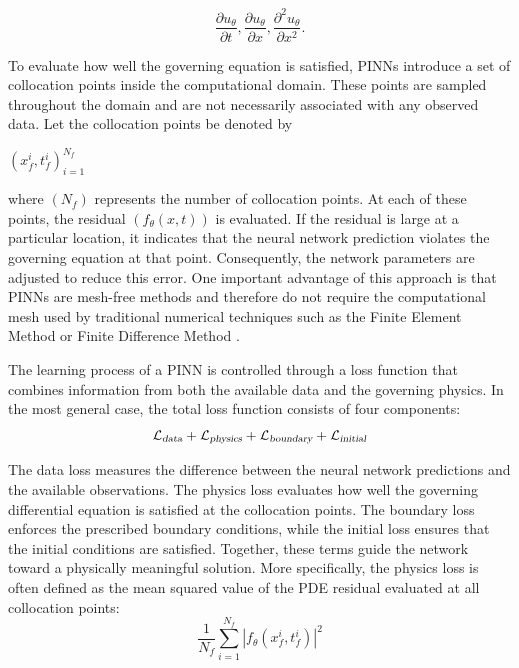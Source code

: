 \documentclass[11pt]{article}
\begin{document}
\begin{equation}
	\frac{\partial u_\theta}{\partial t},
	\frac{\partial u_\theta}{\partial x},
	\frac{\partial^2 u_\theta}{\partial x^2}.
\end{equation}



To evaluate how well the governing equation is satisfied, 
PINNs introduce a set of collocation points inside the computational domain. 
These points are sampled throughout the domain and are not necessarily 
associated with any observed data. Let the collocation points be denoted by

${(x_f^i,t_f^i)}_{i=1}^{N_f}$

where $(N_f)$ represents the number of collocation points. 
At each of these points, the residual $(f_\theta(x,t))$ is evaluated. If the residual is large at a particular location, it indicates that the neural network 
prediction violates the governing 
equation at that point. Consequently, the network parameters are 
adjusted to reduce this error. One important advantage of this approach is 
that PINNs are mesh-free methods and therefore do not require the computational mesh used by traditional 
numerical techniques such as the Finite Element Method or Finite Difference Method\cite{raissiPhysicsinformedNeuralNetworks2019} \cite{cuomoScientificMachineLearning2022}.


The learning process of a PINN is controlled through a loss function that combines 
information from both the available data and the governing physics. 
In the most general case, the total loss function consists of four components:
$$
\mathcal{L_{\textsl{data}}}
+
\mathcal{L_{\textsl{physics}}}
+
\mathcal{L_{\textsl{boundary}}}
+
\mathcal{L_{\textsl{initial}}}
$$

The data loss measures the difference between the neural network 
predictions and the available observations. The physics loss 
evaluates how well the governing differential equation is 
satisfied at the collocation points. The boundary loss enforces 
the prescribed boundary conditions, while the initial loss 
ensures that the initial conditions are satisfied. Together, 
these terms guide the network toward a physically meaningful solution.
More specifically, the physics loss is often defined as the mean squared value of 
the PDE residual evaluated at all collocation points:
\begin{equation}
	\frac{1}{N_f}
	\sum_{i=1}^{N_f}
	\left|
	f_\theta(x_f^i,t_f^i)
	\right|^2
\end{equation}
\end{document}

